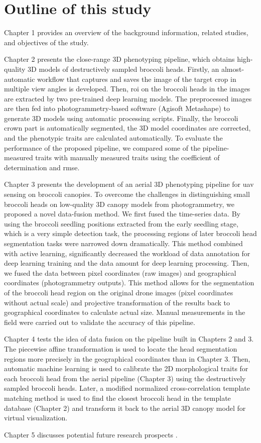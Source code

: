 \section{Outline of this study}

Chapter 1 provides an overview of the background information, related studies, and objectives of the study.

Chapter 2 presents the close-range 3D phenotyping pipeline, which obtains high-quality 3D models of destructively sampled broccoli heads. Firstly, an almost-automatic workflow that captures and saves the image of the target crop in multiple view angles is developed. Then, \gls{roi} on the broccoli heads in the images are extracted by two pre-trained deep learning models. The preprocessed images are then fed into photogrammetry-based software (Agisoft Metashape) to generate 3D models using automatic processing scripts. Finally, the broccoli crown part is automatically segmented, the 3D model coordinates are corrected, and the phenotypic traits are calculated automatically. To evaluate the performance of the proposed pipeline, we compared some of the pipeline-measured traits with manually measured traits using the coefficient of determination and \gls{rmse}.

Chapter 3 presents the development of an aerial 3D phenotyping pipeline for \gls{uav} sensing on broccoli canopies. To overcome the challenges in distinguishing small broccoli heads on low-quality 3D canopy models from photogrammetry, we proposed a novel data-fusion method. We ﬁrst fused the time-series data. By using the broccoli seedling positions extracted from the early seedling stage, which is a very simple detection task, the processing regions of later broccoli head segmentation tasks were narrowed down dramatically. This method combined with active learning, signiﬁcantly decreased the workload of data annotation for deep learning training and the data amount for deep learning processing. Then, we fused the data between pixel coordinates (raw images) and geographical coordinates (photogrammetry outputs). This method allows for the segmentation of the broccoli head region on the original drone images (pixel coordinates without actual scale) and projective transformation of the results back to geographical coordinates to calculate actual size. Manual measurements in the field were carried out to validate the accuracy of this pipeline.

Chapter 4 tests the idea of data fusion on the pipeline built in Chapters 2 and 3. The piecewise affine transformation is used to locate the head segmentation regions more precisely in the geographical coordinates than in Chapter 3. Then, automatic machine learning is used to calibrate the 2D morphological traits for each broccoli head from the aerial pipeline (Chapter 3) using the destructively sampled broccoli heads. Later, a modified normalized cross-correlation template matching method is used to find the closest broccoli head in the template database (Chapter 2) and transform it back to the aerial 3D canopy model for virtual visualization.

Chapter 5  discusses  potential future research prospects .
